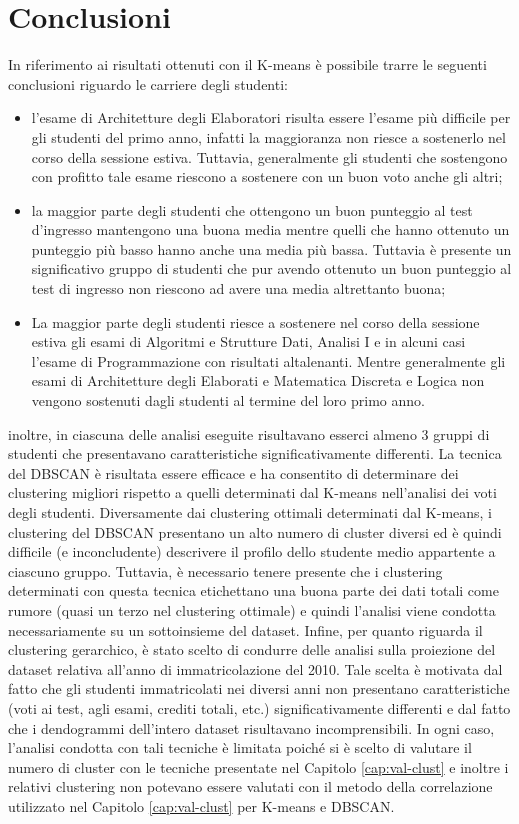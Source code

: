 \documentclass[12pt]{article}
\begin{document}
\section{Conclusioni}
In riferimento ai risultati ottenuti con il K-means è possibile trarre le seguenti conclusioni riguardo
le carriere degli studenti:
\begin{itemize}
\item l'esame di Architetture degli Elaboratori risulta essere l'esame più difficile per gli studenti del primo anno,
  infatti la maggioranza non riesce a sostenerlo nel corso della sessione estiva. Tuttavia, generalmente gli studenti 
  che sostengono con profitto tale esame riescono a sostenere con un buon voto anche gli altri; 
\item la maggior parte degli studenti che ottengono un buon punteggio al test d'ingresso mantengono una buona media
  mentre quelli che hanno ottenuto un punteggio più basso hanno anche una media più bassa. Tuttavia è presente
  un significativo gruppo di studenti che pur avendo ottenuto un buon punteggio al test di ingresso non riescono
  ad avere una media altrettanto buona;
\item La maggior parte degli studenti riesce a sostenere nel corso della sessione estiva gli esami di Algoritmi e 
  Strutture Dati, Analisi I e in alcuni casi l'esame di Programmazione con risultati altalenanti. Mentre 
  generalmente gli esami di Architetture degli Elaborati e Matematica Discreta e Logica non vengono sostenuti
  dagli studenti al termine del loro primo anno.
\end{itemize}
inoltre, in ciascuna delle analisi eseguite risultavano esserci almeno 3 gruppi di studenti che presentavano 
caratteristiche significativamente differenti.
La tecnica del DBSCAN è risultata essere efficace e ha consentito di determinare dei clustering migliori rispetto a quelli determinati dal K-means nell'analisi dei voti degli studenti. Diversamente dai clustering ottimali determinati dal K-means, i clustering del DBSCAN presentano un alto numero di cluster diversi ed è quindi difficile (e inconcludente) descrivere il profilo dello studente medio appartente a ciascuno gruppo. Tuttavia, è necessario tenere presente che i clustering determinati con questa tecnica etichettano una buona parte dei dati totali come rumore (quasi un terzo nel clustering ottimale) e quindi l'analisi viene condotta necessariamente su un sottoinsieme del dataset. Infine, per quanto riguarda il clustering gerarchico, è stato scelto di condurre delle analisi sulla proiezione del dataset relativa all'anno di immatricolazione del 2010. Tale scelta è motivata dal fatto che gli studenti immatricolati nei diversi anni non presentano caratteristiche (voti ai test, agli esami, crediti totali, etc.) significativamente differenti e dal fatto che i dendogrammi dell'intero dataset risultavano incomprensibili. In ogni caso, l'analisi condotta con tali tecniche è limitata poiché si è scelto di valutare il numero di cluster con le tecniche presentate nel Capitolo \ref{cap:val-clust} e inoltre i relativi clustering non potevano essere valutati con il metodo della correlazione utilizzato nel Capitolo \ref{cap:val-clust} per K-means e DBSCAN.
\newpage 

\listoffigures
 
\newpage


\listoftables

\newpage

\end{document}

